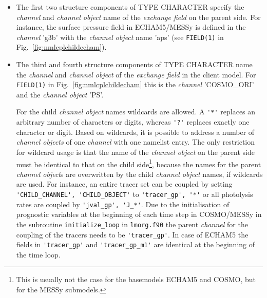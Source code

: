 \documentclass[11pt,twoside]{article}
\begin{document}
\begin{itemize}
\item The first two structure components of {\footnotesize TYPE CHARACTER}
specify the {\it channel} and {\it channel object} name of the 
{\it exchange field} on the parent side. For instance, the surface pressure
field in ECHAM5/MESSy
 is defined in the  {\it channel} 'g3b' with the {\it channel
object} name 'aps' (see \verb|FIELD(1)| in Fig.\ \ref{fig:nmlcplchildecham}).
\item  The third and fourth structure components of 
{\footnotesize TYPE CHARACTER} name the {\it channel} and {\it channel object}
 of the {\it exchange field} in the client model. For \verb|FIELD(1)| in 
Fig.\ \ref{fig:nmlcplchildecham} this is the {\it channel} 'COSMO\_ORI' and the
{\it channel object} 'PS'.

For the child {\it channel object} names wildcards are allowed.
A \verb|'*'| replaces an arbitrary number of characters or digits, whereas
\verb|'?'| replaces exactly one character or digit. Based on wildcards, it 
is possible to address a number of {\it channel objects} of one {\it channel}
 with one namelist entry. The only restriction for wildcard usage is that the 
 name of the {\it channel object} on the parent side must be identical to that 
 on the child side\footnote{This is usually not the case for the basemodels
 ECHAM5 and COSMO, but for the MESSy submodels.},
 because the names for the parent {\it channel object}s are
 overwritten by the child {\it channel object} names, if wildcards are used.
 For instance, an entire tracer set can be coupled by setting 
\verb|'CHILD_CHANNEL', 'CHILD_OBJECT'| to \verb|'tracer_gp', '*'| or all 
photolysis rates are coupled by  \verb|'jval_gp', 'J_*'|.
Due to the initialisation of prognostic variables at the beginning of 
each time step 
in COSMO/MESSy in the subroutine \verb|initialize_loop| in \verb|lmorg.f90|
the parent {\it channel} for the coupling of the tracers needs to be 
\verb|'tracer_gp'|. In case of ECHAM5 the fields in \verb|'tracer_gp'|
and  
\verb|'tracer_gp_m1'| are identical at the beginning of the time loop.


\end{itemize}
\end{document}
